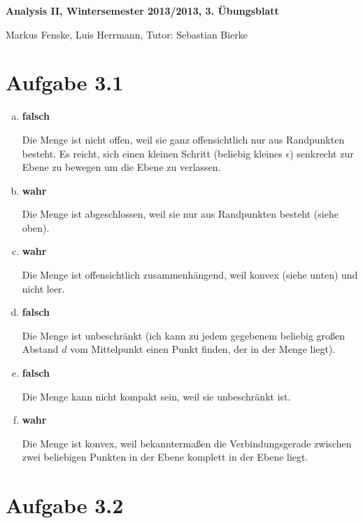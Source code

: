 \documentclass[a4paper,german,12pt,smallheadings]{scrartcl}
\begin{document}
\begin{center}
\bfseries %
\sffamily %
\vspace{-40pt}
Analysis II, Wintersemester 2013/2013, 3. Übungsblatt

Markus Fenske, Luis Herrmann, Tutor: Sebastian Bierke
\vspace{-10pt}
\end{center}

\section*{Aufgabe 3.1}
\begin{enumerate}[a)]
  \item
    \textbf{falsch}

    Die Menge ist nicht offen, weil sie ganz offensichtlich nur aus Randpunkten
    besteht. Es reicht, sich einen kleinen Schritt (beliebig kleines
    $\epsilon$) senkrecht zur Ebene zu bewegen um die Ebene zu verlassen.
  \item
    \textbf{wahr}

    Die Menge ist abgeschlossen, weil sie nur aus Randpunkten besteht (siehe
    oben).
  \item
    \textbf{wahr}

    Die Menge ist offensichtlich zusammenhängend, weil konvex (siehe unten) und
    nicht leer.

  \item
    \textbf{falsch}

    Die Menge ist unbeschränkt (ich kann zu jedem gegebenem beliebig großen
    Abstand $d$ vom Mittelpunkt einen Punkt finden, der in der Menge liegt).

  \item
    \textbf{falsch}

    Die Menge kann nicht kompakt sein, weil sie unbeschränkt ist.
  \item
    \textbf{wahr}

    Die Menge ist konvex, weil bekanntermaßen die Verbindungsgerade zwischen
    zwei beliebigen Punkten in der Ebene komplett in der Ebene liegt.
\end{enumerate}

\section*{Aufgabe 3.2}
\end{document}
